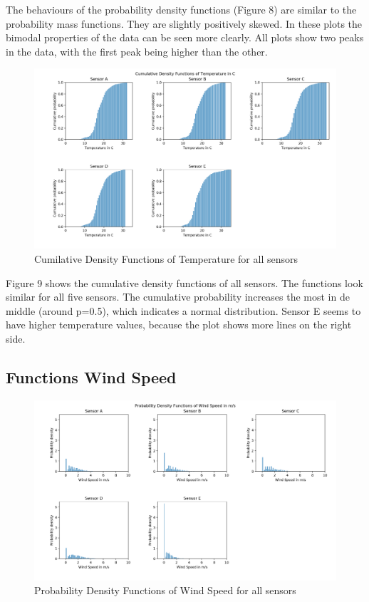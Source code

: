 \documentclass{article}
\begin{document}
            The behaviours of the probability density functions (Figure 8) are similar to the 
            probability mass functions. They are slightly positively skewed. In these plots the 
            bimodal properties of the data can be seen more clearly. All plots show two peaks
            in the data, with the first peak being higher than the other.

            \begin{figure}[H]
                \includegraphics[width=\textwidth]{cdf_temp}
                \caption{Cumilative Density Functions of Temperature for all sensors}
            \end{figure}

            Figure 9 shows the cumulative density functions of all sensors. The functions 
            look similar for all five sensors. The cumulative probability increases the most
            in de middle (around p=0.5), which indicates a normal distribution.
            Sensor E seems to have higher temperature values, because the plot shows more 
            lines on the right side.

        \subsection{Functions Wind Speed}
            \begin{figure}[H]
                \includegraphics[width=\textwidth]{pdf_windspeed}
                \caption{Probability Density Functions of Wind Speed for all sensors}
            \end{figure}
\end{document}
